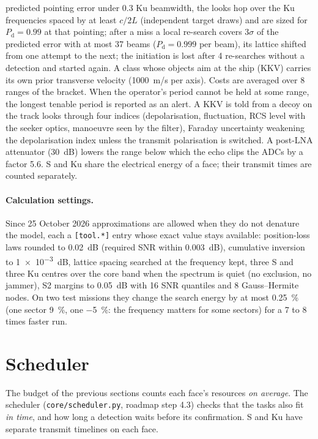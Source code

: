 \documentclass[11pt,a4paper]{article}
\newcommand{\code}[1]{\texttt{\small #1}}
\newcommand{\Pd}{P_{\mathrm d}}
\begin{document}
predicted pointing error under 0.3 Ku beamwidth, the looks hop over the Ku frequencies spaced by at least $c/2L$
(independent target draws) and are sized for $\Pd = 0.99$ at that pointing; after a miss a local re-search covers
$3\sigma$ of the predicted error with at most 37 beams ($\Pd = 0.999$ per beam), its lattice shifted from one attempt
to the next; the initiation is lost after 4 re-searches without a detection and started again. A class whose objects
aim at the ship (KKV) carries its own prior transverse velocity (\SI{1000}{m/s} per axis). Costs are averaged over 8
ranges of the bracket. When the operator's period cannot be held at some range, the longest tenable
period is reported as an alert. A KKV is told from a decoy on the track looks through four indices (depolarisation,
fluctuation, RCS level with the seeker optics, manoeuvre seen by the filter), Faraday uncertainty weakening the
depolarisation index unless the transmit polarisation is switched. A post-LNA attenuator (\SI{30}{dB}) lowers the
range below which the echo clips the ADCs by a factor 5.6. S and Ku share the electrical energy of a face; their
transmit times are counted separately.

\paragraph{Calculation settings.} Since 25 October 2026 approximations are allowed when they do not denature the model,
each a \code{[tool.*]} entry whose exact value stays available: position-loss laws rounded to \SI{0.02}{dB} (required
SNR within \SI{0.003}{dB}), cumulative inversion to \SI{1e-3}{dB}, lattice spacing searched at the frequency kept,
three S and three Ku centres over the core band when the spectrum is quiet (no exclusion, no jammer), S2 margins to
\SI{0.05}{dB} with 16 SNR quantiles and 8 Gauss--Hermite nodes. On two test missions they change the search energy by
at most \SI{+0.25}{\percent} (one sector \SI{+9}{\percent}, one \SI{-5}{\percent}: the frequency matters for some
sectors) for a 7 to 8 times faster run.

\section{Scheduler}\label{sec:sched}
The budget of the previous sections counts each face's resources \emph{on average}. The scheduler
(\code{core/scheduler.py}, roadmap step 4.3) checks that the tasks also fit \emph{in time}, and how long a detection
waits before its confirmation. S and Ku have separate transmit timelines on each face.
\end{document}

